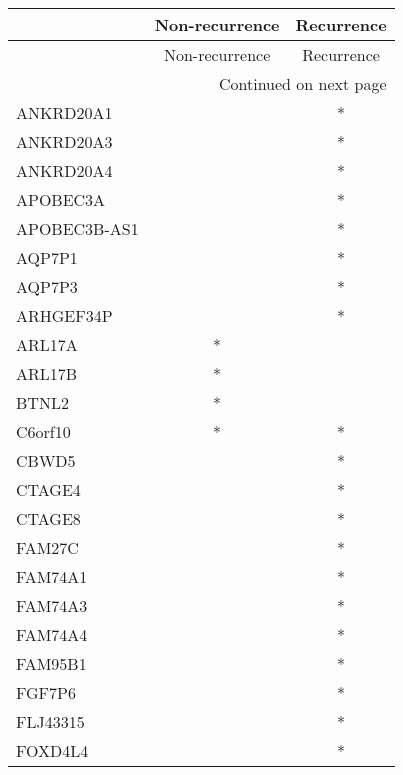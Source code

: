 \begin{longtable}{lcc}
\toprule
{} & Non-recurrence & Recurrence \\
\midrule
\endfirsthead

\toprule
{} & Non-recurrence & Recurrence \\
\midrule
\endhead
\midrule
\multicolumn{3}{r}{{Continued on next page}} \\
\midrule
\endfoot

\bottomrule
\endlastfoot
ANKRD20A1          &                &          * \\
ANKRD20A3          &                &          * \\
ANKRD20A4          &                &          * \\
APOBEC3A           &                &          * \\
APOBEC3B-AS1       &                &          * \\
AQP7P1             &                &          * \\
AQP7P3             &                &          * \\
ARHGEF34P          &                &          * \\
ARL17A             &              * &            \\
ARL17B             &              * &            \\
BTNL2              &              * &            \\
C6orf10            &              * &          * \\
CBWD5              &                &          * \\
CTAGE4             &                &          * \\
CTAGE8             &                &          * \\
FAM27C             &                &          * \\
FAM74A1            &                &          * \\
FAM74A3            &                &          * \\
FAM74A4            &                &          * \\
FAM95B1            &                &          * \\
FGF7P6             &                &          * \\
FLJ43315           &                &          * \\
FOXD4L4            &                &          * \\

\end{longtable}
